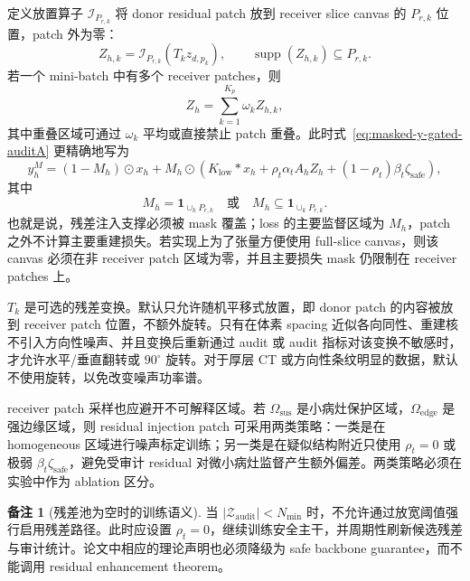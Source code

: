 \documentclass[11pt,a4paper,UTF8,fontset=fandol]{ctexart}
\theoremstyle{definition}
\newtheorem{remark}[theorem]{备注}
\DeclareMathOperator{\supp}{supp}
\newcommand{\cZ}{\mathcal{Z}}
\newcommand{\one}{\mathbf{1}}
\begin{document}
定义放置算子 $\mathcal I_{P_{r,k}}$ 将 donor residual patch 放到 receiver slice canvas 的 $P_{r,k}$ 位置，patch 外为零：
\begin{equation}
    Z_{h,k}=\mathcal I_{P_{r,k}}(T_k z_{d,p_k}),
    \qquad
    \supp(Z_{h,k})\subseteq P_{r,k}.
\end{equation}
若一个 mini-batch 中有多个 receiver patches，则
\begin{equation}
\label{eq:canvas-residual-auditB}
    Z_h=\sum_{k=1}^{K_p} \omega_k Z_{h,k},
\end{equation}
其中重叠区域可通过 $\omega_k$ 平均或直接禁止 patch 重叠。此时式~\eqref{eq:masked-y-gated-auditA} 更精确地写为
\begin{equation}
\label{eq:masked-y-canvas-auditB}
    y_h^M=(1-M_h)\odot x_h
    +M_h\odot\left(K_{\mathrm{low}}*x_h+\rho_t\alpha_tA_hZ_h+(1-\rho_t)\beta_t\zeta_{\mathrm{safe}}\right),
\end{equation}
其中
\begin{equation}
    M_h=\one_{\cup_k P_{r,k}}
    \quad\text{或}\quad
    M_h\subseteq \one_{\cup_k P_{r,k}}.
\end{equation}
也就是说，残差注入支撑必须被 mask 覆盖；loss 的主要监督区域为 $M_h$，patch 之外不计算主要重建损失。若实现上为了张量方便使用 full-slice canvas，则该 canvas 必须在非 receiver patch 区域为零，并且主要损失 mask 仍限制在 receiver patches 上。

$T_k$ 是可选的残差变换。默认只允许随机平移式放置，即 donor patch 的内容被放到 receiver patch 位置，不额外旋转。只有在体素 spacing 近似各向同性、重建核不引入方向性噪声、并且变换后重新通过 audit 或 audit 指标对该变换不敏感时，才允许水平/垂直翻转或 $90^\circ$ 旋转。对于厚层 CT 或方向性条纹明显的数据，默认不使用旋转，以免改变噪声功率谱。

receiver patch 采样也应避开不可解释区域。若 $\Omega_{\mathrm{sus}}$ 是小病灶保护区域，$\Omega_{\mathrm{edge}}$ 是强边缘区域，则 residual injection patch 可采用两类策略：一类是在 homogeneous 区域进行噪声标定训练；另一类是在疑似结构附近只使用 $\rho_t=0$ 或极弱 $\beta_t\zeta_{\mathrm{safe}}$，避免受审计 residual 对微小病灶监督产生额外偏差。两类策略必须在实验中作为 ablation 区分。

\begin{remark}[残差池为空时的训练语义]
当 $|\cZ_{\mathrm{audit}}|<N_{\min}$ 时，不允许通过放宽阈值强行启用残差路径。此时应设置 $\rho_t=0$，继续训练安全主干，并周期性刷新候选残差与审计统计。论文中相应的理论声明也必须降级为 safe backbone guarantee，而不能调用 residual enhancement theorem。
\end{remark}
\end{document}
